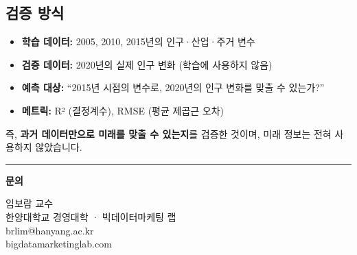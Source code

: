 \documentclass[11pt, a4paper]{article}
\begin{document}
\subsection{검증 방식}

\begin{itemize}[itemsep=4pt, leftmargin=2em]
  \item \textbf{학습 데이터:} 2005, 2010, 2015년의 인구·산업·주거 변수
  \item \textbf{검증 데이터:} 2020년의 실제 인구 변화 (학습에 사용하지 않음)
  \item \textbf{예측 대상:} ``2015년 시점의 변수로, 2020년의 인구 변화를 맞출 수 있는가?''
  \item \textbf{메트릭:} R² (결정계수), RMSE (평균 제곱근 오차)
\end{itemize}

즉, \textbf{과거 데이터만으로 미래를 맞출 수 있는지}를 검증한 것이며, 미래 정보는 전혀 사용하지 않았습니다.

\vspace{1cm}

\begin{center}
\textcolor{medblue}{\rule{8cm}{0.8pt}}

\vspace{0.8cm}

{\Large\bfseries\color{darkblue} 문의}

\vspace{0.4cm}

{\large\color{darkgray}
임보람 교수\\[3pt]
한양대학교 경영대학 · 빅데이터마케팅 랩\\[6pt]
brlim@hanyang.ac.kr\\[3pt]
bigdatamarketinglab.com}
\end{center}
\end{document}
